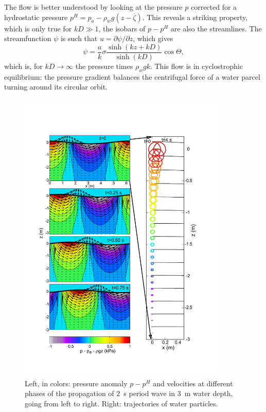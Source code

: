 The flow is better understood by looking at the pressure $p$ 
corrected for a hydrostatic pressure $p^H=p_a-\rho_w g (z-\overline{\zeta})$. This reveals a striking property, 
which is only true for $kD \gg 1$, the isobars of $p-p^H$ are also the streamlines. The streamfunction 
$\psi$ is such that $u=\partial \psi/\partial z$, which gives
\begin{equation}
    \psi=  \frac{a}{k}\sigma
    \frac{\sinh\left(kz+kD\right)}{\sinh\left(kD\right)}
    \cos \Theta,
      \label{potentiel}
\end{equation}
which is, for $kD\rightarrow \infty$ the pressure times $\rho_w g k$. 
This flow is in cyclostrophic equilibrium: the pressure gradient balances the 
centrifugal force of a water parcel turning around its circular orbit. 
\begin{figure}
\centerline{\includegraphics[width=0.9\textwidth]{FIGS_CH_AIRY/2sec_3mdepth_puv_drift.pdf}}
  \caption{Left, in colors: pressure anomaly $p-p^H$ and velocities at different phases 
of the propagation of 2~s period wave in 3~m water depth, going from left to right. 
Right: trajectories of water particles.}
\label{fig:puvdrift}
\end{figure}



